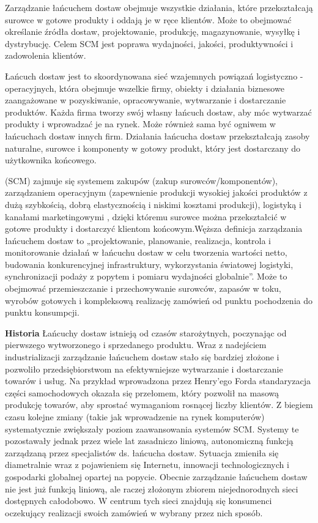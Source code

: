Zarządzanie łańcuchem dostaw obejmuje wszystkie działania, które przekształcają surowce w gotowe produkty i oddają je w ręce klientów. Może to obejmować określanie źródła dostaw, projektowanie, produkcję, magazynowanie, wysyłkę i dystrybucję. Celem SCM jest poprawa wydajności, jakości, produktywności i zadowolenia klientów. \cite{scm2023}

Łańcuch dostaw jest to skoordynowana sieć wzajemnych powiązań logistyczno - operacyjnych, która obejmuje wszelkie firmy, obiekty i działania biznesowe zaangażowane w pozyskiwanie, opracowywanie, wytwarzanie i dostarczanie produktów.
Każda firma tworzy swój własny łańcuch dostaw, aby móc wytwarzać produkty i wprowadzać je na rynek. Może również sama być ogniwem w łańcuchach dostaw innych firm. Działania łańcucha dostaw przekształcają zasoby naturalne, surowce i komponenty w gotowy produkt, który jest dostarczany do użytkownika końcowego. \cite{wdx2023}

 (SCM) zajmuje się systemem zakupów (zakup surowców/komponentów), zarządzaniem operacyjnym (zapewnienie produkcji wysokiej jakości produktów z dużą szybkością, dobrą elastycznością i niskimi kosztami produkcji), logistyką i kanałami marketingowymi , dzięki któremu surowce można przekształcić w gotowe produkty i dostarczyć klientom końcowym.Węższa definicja zarządzania łańcuchem dostaw to „projektowanie, planowanie, realizacja, kontrola i monitorowanie działań w łańcuchu dostaw w celu tworzenia wartości netto, budowania konkurencyjnej infrastruktury, wykorzystania światowej logistyki, synchronizacji podaży z popytem i pomiaru wydajności globalnie”. Może to obejmować przemieszczanie i przechowywanie surowców, zapasów w toku, wyrobów gotowych i kompleksową realizację zamówień od punktu pochodzenia do punktu konsumpcji. \cite{wiken2023}

\vspace{\baselineskip}
\textbf{Historia}
Łańcuchy dostaw istnieją od czasów starożytnych, poczynając od pierwszego wytworzonego i sprzedanego produktu. Wraz z nadejściem industrializacji zarządzanie łańcuchem dostaw stało się bardziej złożone i pozwoliło przedsiębiorstwom na efektywniejsze wytwarzanie i dostarczanie towarów i usług. Na przykład wprowadzona przez Henry'ego Forda standaryzacja części samochodowych okazała się przełomem, który pozwolił na masową produkcję towarów, aby sprostać wymaganiom rosnącej liczby klientów. Z biegiem czasu kolejne zmiany (takie jak wprowadzenie na rynek komputerów) systematycznie zwiększały poziom zaawansowania systemów SCM. Systemy te pozostawały jednak przez wiele lat zasadniczo liniową, autonomiczną funkcją zarządzaną przez specjalistów ds. łańcucha dostaw. 
Sytuacja zmieniła się diametralnie wraz z pojawieniem się Internetu, innowacji technologicznych i gospodarki globalnej opartej na popycie. Obecnie zarządzanie łańcuchem dostaw nie jest już funkcją liniową, ale raczej złożonym zbiorem niejednorodnych sieci dostępnych całodobowo. W centrum tych sieci znajdują się konsumenci oczekujący realizacji swoich zamówień w wybrany przez nich sposób.\cite{oracle2023}

